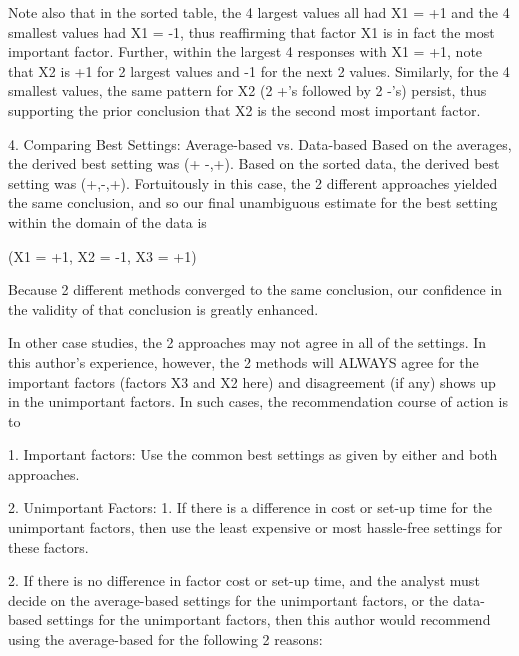          Note also that in the sorted table, the 4
         largest values all had X1 = +1 and the 4
         smallest values had X1 = -1, thus
         reaffirming that factor X1 is in fact the
         most important factor.  Further, within
         the largest 4 responses with X1 = +1,
         note that X2 is +1 for 2 largest values
         and -1 for the next 2 values.  Similarly,
         for the 4 smallest values, the same
         pattern for X2 (2 +'s followed by 2 -'s)
         persist, thus supporting the prior
         conclusion that X2 is the second most
         important factor.

   4. Comparing Best Settings: Average-based vs. Data-based
      Based on the averages, the derived best
      setting was (+ -,+).  Based on the sorted
      data, the derived best setting was (+,-,+).
      Fortuitously in this case, the 2 different
      approaches yielded the same conclusion, and
      so our final unambiguous estimate for the
      best setting within the domain of the data is

         (X1 = +1, X2 = -1, X3 = +1)

      Because 2 different methods converged to the
      same conclusion, our confidence in the
      validity of that conclusion is greatly
      enhanced.

      In other case studies, the 2 approaches may
      not agree in all of the settings.  In this
      author's experience, however, the 2 methods
      will ALWAYS agree for the important factors
      (factors X3 and X2 here) and disagreement
      (if any) shows up in the unimportant
      factors.  In such cases, the recommendation
      course of action is to

         1. Important factors:
            Use the common best settings as given
            by either and both approaches.

         2. Unimportant Factors:
            1. If there is a difference in cost or
               set-up time for the unimportant
               factors, then use the least
               expensive or most hassle-free
               settings for these factors.

            2. If there is no difference in factor
               cost or set-up time, and the
               analyst must decide on the
               average-based settings for the
               unimportant factors, or the
               data-based settings for the
               unimportant factors, then this
               author would recommend using the
               average-based for the following 2
               reasons:

